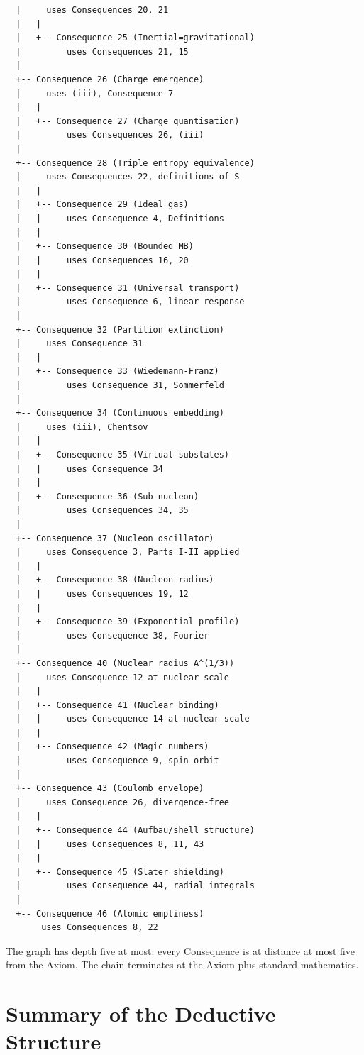 \documentclass[11pt,twocolumn,a4paper]{article}
\theoremstyle{axiomstyle}
\theoremstyle{conseqstyle}
\theoremstyle{definition}
\theoremstyle{remark}
\begin{document}
\begin{center}
\begin{verbatim}
  |     uses Consequences 20, 21
  |   |
  |   +-- Consequence 25 (Inertial=gravitational)
  |         uses Consequences 21, 15
  |
  +-- Consequence 26 (Charge emergence)
  |     uses (iii), Consequence 7
  |   |
  |   +-- Consequence 27 (Charge quantisation)
  |         uses Consequences 26, (iii)
  |
  +-- Consequence 28 (Triple entropy equivalence)
  |     uses Consequences 22, definitions of S
  |   |
  |   +-- Consequence 29 (Ideal gas)
  |   |     uses Consequence 4, Definitions
  |   |
  |   +-- Consequence 30 (Bounded MB)
  |   |     uses Consequences 16, 20
  |   |
  |   +-- Consequence 31 (Universal transport)
  |         uses Consequence 6, linear response
  |
  +-- Consequence 32 (Partition extinction)
  |     uses Consequence 31
  |   |
  |   +-- Consequence 33 (Wiedemann-Franz)
  |         uses Consequence 31, Sommerfeld
  |
  +-- Consequence 34 (Continuous embedding)
  |     uses (iii), Chentsov
  |   |
  |   +-- Consequence 35 (Virtual substates)
  |   |     uses Consequence 34
  |   |
  |   +-- Consequence 36 (Sub-nucleon)
  |         uses Consequences 34, 35
  |
  +-- Consequence 37 (Nucleon oscillator)
  |     uses Consequence 3, Parts I-II applied
  |   |
  |   +-- Consequence 38 (Nucleon radius)
  |   |     uses Consequences 19, 12
  |   |
  |   +-- Consequence 39 (Exponential profile)
  |         uses Consequence 38, Fourier
  |
  +-- Consequence 40 (Nuclear radius A^(1/3))
  |     uses Consequence 12 at nuclear scale
  |   |
  |   +-- Consequence 41 (Nuclear binding)
  |   |     uses Consequence 14 at nuclear scale
  |   |
  |   +-- Consequence 42 (Magic numbers)
  |         uses Consequence 9, spin-orbit
  |
  +-- Consequence 43 (Coulomb envelope)
  |     uses Consequence 26, divergence-free
  |   |
  |   +-- Consequence 44 (Aufbau/shell structure)
  |   |     uses Consequences 8, 11, 43
  |   |
  |   +-- Consequence 45 (Slater shielding)
  |         uses Consequence 44, radial integrals
  |
  +-- Consequence 46 (Atomic emptiness)
       uses Consequences 8, 22
\end{verbatim}
\end{center}

The graph has depth five at most: every Consequence is at distance at most five from the Axiom. The chain terminates at the Axiom plus standard mathematics.

\appendix

\section{Summary of the Deductive Structure}
\label{app:deductive}
\end{document}
